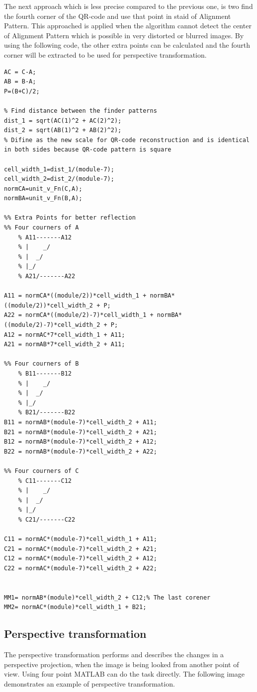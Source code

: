 The next approach which is less precise compared to the previous one, is two find the fourth corner of the QR-code and use that point in staid of Alignment Pattern. This approached is applied when the algorithm cannot detect the center of Alignment Pattern which is possible in very distorted or blurred images.
By using the following code, the other extra points can be calculated and the fourth corner will be extracted to be used for perspective transformation.
\begin{lstlisting}
AC = C-A;
AB = B-A;
P=(B+C)/2;
    
% Find distance between the finder patterns
dist_1 = sqrt(AC(1)^2 + AC(2)^2);
dist_2 = sqrt(AB(1)^2 + AB(2)^2); 
% Difine as the new scale for QR-code reconstruction and is identical in both sides because QR-code pattern is square

cell_width_1=dist_1/(module-7);
cell_width_2=dist_2/(module-7);
normCA=unit_v_Fn(C,A);
normBA=unit_v_Fn(B,A);

%% Extra Points for better reflection
%% Four courners of A
    % A11-------A12
    % |    _/
    % |  _/
    % |_/
    % A21/-------A22

A11 = normCA*((module/2))*cell_width_1 + normBA*((module/2))*cell_width_2 + P;
A22 = normCA*((module/2)-7)*cell_width_1 + normBA*((module/2)-7)*cell_width_2 + P;
A12 = normAC*7*cell_width_1 + A11;
A21 = normAB*7*cell_width_2 + A11;

%% Four courners of B
    % B11-------B12
    % |    _/
    % |  _/
    % |_/
    % B21/-------B22
B11 = normAB*(module-7)*cell_width_2 + A11;
B21 = normAB*(module-7)*cell_width_2 + A21;
B12 = normAB*(module-7)*cell_width_2 + A12;
B22 = normAB*(module-7)*cell_width_2 + A22;

%% Four courners of C
    % C11-------C12
    % |    _/
    % |  _/
    % |_/
    % C21/-------C22

C11 = normAC*(module-7)*cell_width_1 + A11;
C21 = normAC*(module-7)*cell_width_2 + A21;
C12 = normAC*(module-7)*cell_width_2 + A12;
C22 = normAC*(module-7)*cell_width_2 + A22;


MM1= normAB*(module)*cell_width_2 + C12;% The last corener 
MM2= normAC*(module)*cell_width_1 + B21;        
\end{lstlisting}


\subsection{Perspective transformation}

The perspective transformation performs and describes the changes in a perspective projection, when the image is being looked from another point of view\cite{WikiHomo}. Using four point MATLAB can do the task directly. The following image demonstrates an example of perspective transformation.

